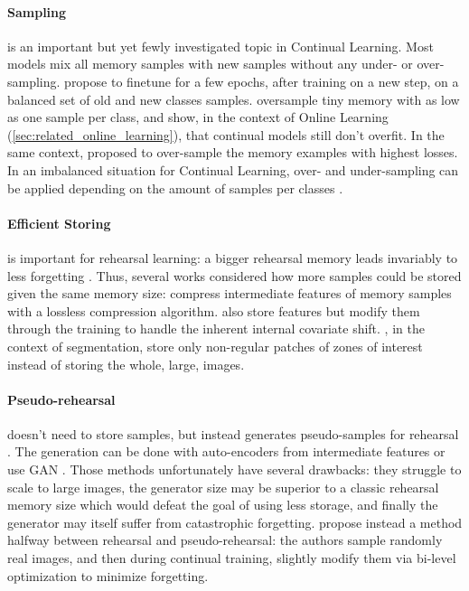 \paragraph{Sampling} is an important but yet fewly investigated topic in Continual Learning. Most
models mix all memory samples with new samples without any under- or over-sampling.
\cite{castro2018end_to_end_inc_learn} propose to finetune for a few epochs, after training on a new
step, on a balanced set of old and new classes samples. \cite{chaudhry2019tinyepisodicmemories}
oversample tiny memory with as low as one sample per class, and show, in the context of Online
Learning (\autoref{sec:related_online_learning}), that continual models still don't overfit. In the
same context, \cite{aljundi2019maximallyinterfered} proposed to over-sample the memory examples with
highest losses. In an imbalanced situation for Continual Learning, over- and under-sampling can be
applied depending on the amount of samples per classes \citep{kim2020imbalancedcontinual}.

\paragraph{Efficient Storing} is important for rehearsal learning: a bigger rehearsal memory leads
invariably to less forgetting \citep{douillard2020podnet}. Thus, several works considered how more
samples could be stored given the same memory size: \cite{hayes2020remind} compress intermediate
features of memory samples with a lossless compression algorithm.
\cite{iscen2020incrementalfeatureadaptation} also store features but modify them through the
training to handle the inherent internal covariate shift. \cite{douillard2021objectrehearsal}, in
the context of segmentation, store only non-regular patches of zones of interest instead of storing
the whole, large, images.

\paragraph{Pseudo-rehearsal} doesn't need to store samples, but instead generates pseudo-samples for
rehearsal \citep{lesort2019generative}. The generation can be done with auto-encoders from
intermediate features \citep{kemker2018fearnet,ayub2021eec} or use \ac{GAN}
\citep{shin2017deep_generative_replay}. Those methods unfortunately have several drawbacks: they
struggle to scale to large images, the generator size may be superior to a classic rehearsal memory
size which would defeat the goal of using less storage, and finally the generator may itself suffer
from catastrophic forgetting. \cite{liu2020mnemonics} propose instead a method halfway between
rehearsal and pseudo-rehearsal: the authors sample randomly real images, and then during continual
training, slightly modify them via bi-level optimization to minimize forgetting.


